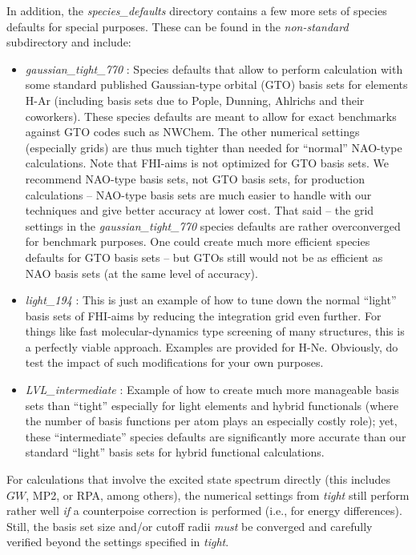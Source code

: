 In addition, the \emph{species\_defaults} directory contains a few
more sets of species defaults for special purposes. These can be found
in the \emph{non-standard} subdirectory and include:
\begin{itemize}
  \item \emph{gaussian\_tight\_770} : Species defaults that allow to
    perform calculation with some standard published Gaussian-type
    orbital (GTO) basis sets for elements H-Ar (including basis sets due to
    Pople, Dunning, Ahlrichs and their coworkers). These species
    defaults are meant to allow for exact benchmarks against
    GTO codes such as NWChem. The other
    numerical settings (especially grids) are thus much tighter than
    needed for ``normal'' NAO-type calculations. Note that FHI-aims is
    not optimized for GTO basis sets. We recommend
    NAO-type basis sets, not GTO basis sets, for production
    calculations -- NAO-type basis sets are much easier to handle
    with our techniques and give better accuracy at lower cost. That
    said -- the grid settings in the \emph{gaussian\_tight\_770}
    species defaults are rather overconverged for benchmark
    purposes. One could create much more efficient species defaults for
    GTO basis sets -- but GTOs still would not be as efficient as NAO
    basis sets (at the same level of accuracy).
  \item \emph{light\_194} : This is just an example of how to tune
    down the normal ``light'' basis sets of FHI-aims by reducing the
    integration grid even further. For things like fast
    molecular-dynamics type screening of many structures, this is a
    perfectly viable approach. Examples are provided for
    H-Ne. Obviously, do test the impact of such modifications for your
    own purposes.
  \item \emph{LVL\_intermediate} : Example of how to create much more
    manageable basis sets than ``tight'' especially for light elements and
    hybrid functionals (where the number of basis functions per atom
    plays an especially costly role); yet, these ``intermediate''
    species defaults are significantly more accurate than our standard
    ``light'' basis sets for hybrid functional calculations. 
\end{itemize}

For calculations that involve the excited state spectrum directly (this
includes $GW$, MP2, or RPA, among others), the numerical settings
from \emph{tight} still perform rather well \emph{if} a
counterpoise correction is performed (i.e., for energy
differences). Still, the basis set size and/or cutoff radii
\emph{must} be converged and carefully verified beyond the settings
specified in \emph{tight}.

